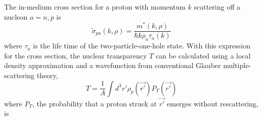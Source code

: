 
The in-medium cross section for a proton with momentum $k$ scattering off a
nucleon $a=n,p$ is
\begin{equation}
    \widetilde{\sigma}_{pa}(k,\rho)=\frac{m^{*}(k, \rho)}{\hbar k \rho_{a} \tau_{a}(k)}
\end{equation}
where $\tau_a$ is the life time of the two-particle-one-hole state.
With this expression for the cross section, the nuclear transparency $T$ can be
calculated using a local density approximation and a wavefunction from
conventional Glauber multiple-scattering theory,
\begin{equation}
    T=\frac{1}{A} \int d^3r' \rho_{p}(\vec{r'}) P_{T}(\vec{r'})
\end{equation}
where $P_T$, the probability that a proton struck at $\vec{r'}$ emerges without
rescattering, is

